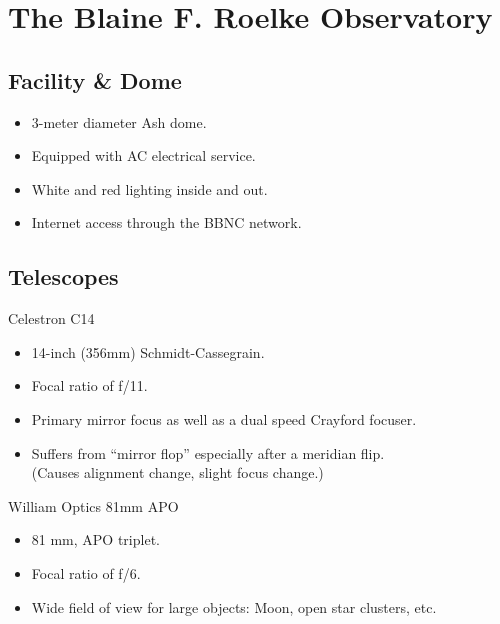 \section{The Blaine F. Roelke Observatory}

\subsection{Facility \& Dome}

\begin{frame}[t]{\insertsubsectionhead}
  \Large
  \begin{itemize}
    \item 3-meter diameter Ash dome.
    \item Equipped with AC electrical service.
    \item White and red lighting inside and out.
    \item Internet access through the BBNC network.
  \end{itemize}
\end{frame}

\subsection{Telescopes}

\begin{frame}[t]{Celestron C14}
  \Large
  \begin{itemize}
    \item 14-inch (356mm) Schmidt-Cassegrain.
    \item Focal ratio of f/11.
    \item Primary mirror focus as well as a dual speed Crayford focuser.
    \item Suffers from ``mirror flop'' especially after a meridian flip.\\
          (Causes alignment change, slight focus change.)
  \end{itemize}
 \end{frame}


\begin{frame}[t]{William Optics 81mm APO}
  \Large
  \begin{itemize}
    \item 81 mm, APO triplet.
    \item Focal ratio of f/6.
    \item Wide field of view for large objects: Moon, open star clusters, etc.
  \end{itemize}

\end{frame}

